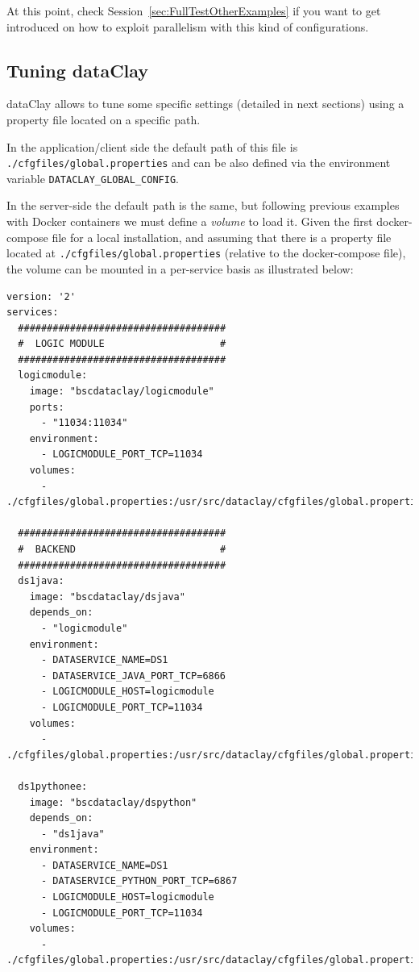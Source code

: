 At this point, check Session~\ref{sec:FullTestOtherExamples} if you want to get introduced on how to exploit parallelism with this kind of configurations.


\subsection{Tuning dataClay}

dataClay allows to tune some specific settings (detailed in next sections) using a property file located on a specific path. 

In the application/client side the default path of this file is \texttt{./cfgfiles/global.properties} and can be also defined via the environment variable \texttt{DATACLAY\_GLOBAL\_CONFIG}.

In the server-side the default path is the same, but following previous examples with Docker containers we must define a \textit{volume} to load it. Given the first docker-compose file for a local installation, and assuming that there is a property file located at \texttt{./cfgfiles/global.properties} (relative to the docker-compose file), the volume can be mounted in a per-service basis as illustrated below:

\begin{tBox}
 \begin{lstlisting}[language=docker-compose-2, frame=none]
version: '2' 
services:
  ####################################
  #  LOGIC MODULE                    #
  ####################################
  logicmodule:
    image: "bscdataclay/logicmodule"
    ports:
      - "11034:11034"
    environment:
      - LOGICMODULE_PORT_TCP=11034
    volumes:
      - ./cfgfiles/global.properties:/usr/src/dataclay/cfgfiles/global.properties

  ####################################
  #  BACKEND                         #
  ####################################
  ds1java:
    image: "bscdataclay/dsjava"
    depends_on:
      - "logicmodule"
    environment:
      - DATASERVICE_NAME=DS1
      - DATASERVICE_JAVA_PORT_TCP=6866
      - LOGICMODULE_HOST=logicmodule
      - LOGICMODULE_PORT_TCP=11034
    volumes:
      - ./cfgfiles/global.properties:/usr/src/dataclay/cfgfiles/global.properties

  ds1pythonee:
    image: "bscdataclay/dspython"
    depends_on:
      - "ds1java"
    environment:
      - DATASERVICE_NAME=DS1
      - DATASERVICE_PYTHON_PORT_TCP=6867
      - LOGICMODULE_HOST=logicmodule
      - LOGICMODULE_PORT_TCP=11034     
    volumes:
      - ./cfgfiles/global.properties:/usr/src/dataclay/cfgfiles/global.properties
 \end{lstlisting}
\end{tBox}

